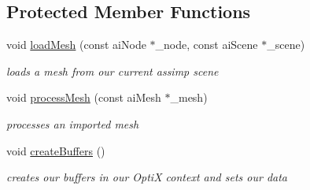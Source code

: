 \subsection*{Protected Member Functions}
\begin{DoxyCompactItemize}
\item 
\hypertarget{class_opti_x_model_a67c070a756231acd6a7ad9aef7c8c505}{void \hyperlink{class_opti_x_model_a67c070a756231acd6a7ad9aef7c8c505}{load\-Mesh} (const ai\-Node $\ast$\-\_\-node, const ai\-Scene $\ast$\-\_\-scene)}\label{class_opti_x_model_a67c070a756231acd6a7ad9aef7c8c505}

\begin{DoxyCompactList}\small\item\em loads a mesh from our current assimp scene \end{DoxyCompactList}\item 
\hypertarget{class_opti_x_model_a6c35b710b10cb8671fb7644d8832d837}{void \hyperlink{class_opti_x_model_a6c35b710b10cb8671fb7644d8832d837}{process\-Mesh} (const ai\-Mesh $\ast$\-\_\-mesh)}\label{class_opti_x_model_a6c35b710b10cb8671fb7644d8832d837}

\begin{DoxyCompactList}\small\item\em processes an imported mesh \end{DoxyCompactList}\item 
\hypertarget{class_opti_x_model_a48b8aed79fd7eae1d03bd58f2a57b95a}{void \hyperlink{class_opti_x_model_a48b8aed79fd7eae1d03bd58f2a57b95a}{create\-Buffers} ()}\label{class_opti_x_model_a48b8aed79fd7eae1d03bd58f2a57b95a}

\begin{DoxyCompactList}\small\item\em creates our buffers in our Opti\-X context and sets our data \end{DoxyCompactList}\end{DoxyCompactItemize}
